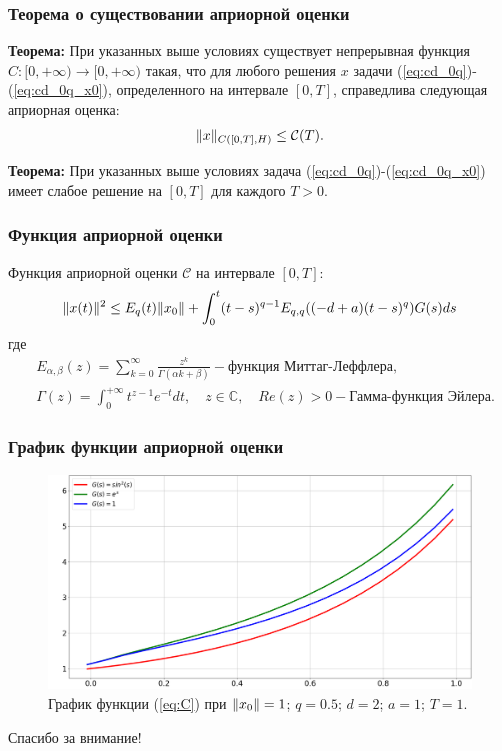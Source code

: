 \documentclass{beamer}
\DeclarePairedDelimiter{\norm}{\lVert}{\rVert}
\begin{document}
    \begin{frame}
        \frametitle{Теорема о существовании априорной оценки}
        \textbf{Теорема:}
        При указанных выше условиях существует непрерывная функция $C: [0, +\infty) \rightarrow [0, +\infty)$ такая,
        что для любого решения $x$ задачи (\ref{eq:cd_0q})-(\ref{eq:cd_0q_x0}), определенного на интервале $[0, T]$,
        справедлива следующая априорная оценка:
        $$\norm{x}_{C([0, T], H)} \leq \mathcal{C}(T).$$

        \textbf{Теорема:}
        При указанных выше условиях задача (\ref{eq:cd_0q})-(\ref{eq:cd_0q_x0}) имеет слабое решение на $[0, T]$ для каждого $T > 0$.
    \end{frame}

    \begin{frame}
        \frametitle{Функция априорной оценки}
        Функция априорной оценки $\mathcal{C}$ на интервале $[0, T]$:
        \begin{equation}
            \label{eq:C}
            \norm{x(t)}^2 \leq E_q(t)\norm{x_0} + \int_0^t (t-s)^{q-1} E_{q,q}((-d+a)(t-s)^q)G(s)ds
        \end{equation}
        где
        \begin{equation*}
            \begin{aligned}
                &E_{\alpha, \beta}(z) = \sum_{k=0}^\infty \frac{z^k}{\Gamma (\alpha k + \beta)} - \text{функция Миттаг-Леффлера,}\\
                &\Gamma(z) = \int_0^{+\infty} t^{z-1} e^{-t} dt, \quad z \in \mathbb{C}, \quad Re(z) > 0 - \text{Гамма-функция Эйлера.}
            \end{aligned}
        \end{equation*}
    \end{frame}

    \begin{frame}
        \frametitle{График функции априорной оценки}
        \begin{figure}
            \includegraphics[width=0.75\linewidth]{plot}
            \caption{График функции (\ref{eq:C}) при $\norm{x_0} = 1$; $q = 0.5$; $d = 2$; $a = 1$; $T = 1$.}
        \end{figure}
    \end{frame}

    \begin{frame}
        \begin{block}{}
            \centerline{\color{blue}Спасибо за внимание!}
        \end{block}
    \end{frame}
\end{document}
